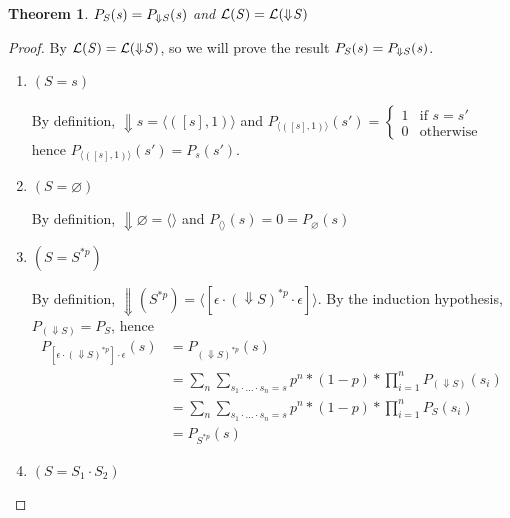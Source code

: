 \documentclass[acmsmall,screen,anonymous]{acmart}
\newtheorem*{theorem*}{Theorem}
\begin{document}
\begin{theorem*}
  $P_{\mathit{S}}(\mathit{s}) = P_{\Downarrow
    \mathit{S}}(\mathit{s})$ and $\mathcal{L}(\mathit{S}) =
  \mathcal{L}(\Downarrow\mkern-4mu \mathit{S})$
\end{theorem*}
\begin{proof}
By  $\mathcal{L}(\mathit{S}) =
  \mathcal{L}(\Downarrow\mkern-4mu \mathit{S})$, so we will prove the result $P_{\mathit{S}}(\mathit{s}) = P_{\Downarrow
    \mathit{S}}(\mathit{s})$.
\begin{enumerate}
\item
$(S = s)$

By definition, $\Downarrow s = \langle ([s],1) \rangle$ and $P_{\langle ([s], 1) \rangle}(s') = 
\begin{cases}
1 & \text{if } s = s'\\
0 & \text{otherwise}
\end{cases}$ hence $P_{\langle ([s],1) \rangle}(s') = P_s(s')$.
\item
$(S = \varnothing)$

By definition, $\Downarrow \varnothing = \langle \rangle$ and $P_{\langle \rangle}(s) = 0 = P_{\varnothing}(s)$
\item
$(S = S^{*p})$

By definition, $\Downarrow (S^{*p}) = \langle [\epsilon \cdot (\Downarrow S)^{*p} \cdot \epsilon] \rangle $. By the induction hypothesis, $P_{(\Downarrow S)} = P_{S}$, hence
\begin{align*}
P_{[\epsilon \cdot (\Downarrow S)^{*p}] \cdot \epsilon}(s) &= P_{(\Downarrow S)^{*p}}(s)\\
&= \sum_n \sum_{s_1 \cdot \ldots \cdot s_n=s} p^n * (1-p) * \prod_{i=1}^n P_{(\Downarrow S)}(s_i)\\
&= \sum_n \sum_{s_1 \cdot \ldots \cdot s_n=s} p^n * (1-p) * \prod_{i=1}^n P_{S}(s_i)\\
&= P_{S^{*p}}(s)
\end{align*}
\item
$(S = S_1 \cdot S_2)$


\end{enumerate}
\end{proof}
\end{document}
